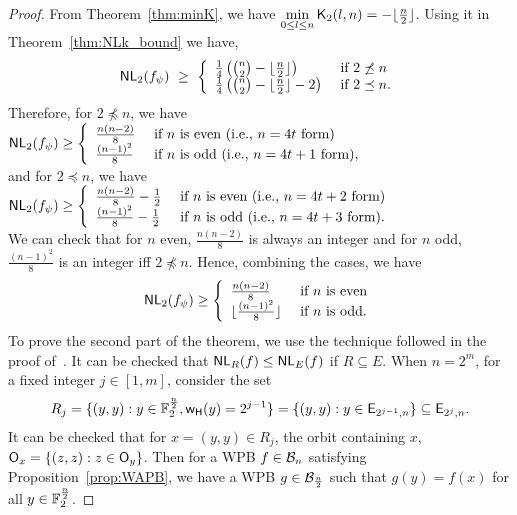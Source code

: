 \documentclass{llncs}
\begin{document}
\begin{proof}
From Theorem~\ref{thm:minK}, we have 
$\min\limits_{0 \leq l \leq n} \mathsf{K}_{2}(l,n) = -\lfloor \frac{n}{2} \rfloor$. 
Using it in Theorem~\ref{thm:NLk_bound} we have,
$$\mathsf{NL}_{2}(f_\psi) ~\geq ~ 
\left\{ \begin{array}{ll}
\frac{1}{4}\left({n \choose 2} - \lfloor \frac{n}{2} \rfloor\right)  & \text{ if }  2 \not\preceq n \\
\frac{1}{4}\left({n \choose 2} -\lfloor \frac{n}{2} \rfloor - 2\right) & \text{ if } 2 \preceq n.
\end{array}   \right.$$
Therefore, for $2 \npreceq n$, we have
$\mathsf{NL}_{2}(f_\psi) \geq \left\{
\begin{array}{ll}
 \frac{n(n-2)}{8} & \text{ if } n \text{ is even (i.e., $n = 4t$ form)}\\
 \frac{(n-1)^2}{8} & \text{ if } n \text{ is odd (i.e., $n = 4t+1$ form)},
\end{array} \right.$\\
and for $2 \preceq n$, we have 
$\mathsf{NL}_{2}(f_\psi) \geq \left\{
\begin{array}{ll}
 \frac{n(n-2)}{8}-\frac{1}{2} & \text{ if } n \text{ is even (i.e., $n = 4t+2$ form)} \\
 \frac{(n-1)^2}{8}-\frac{1}{2} & \text{ if } n \text{ is odd (i.e., $n = 4t+3$ form)}.
\end{array} \right.$\\
We can check that for $n$ even, $\frac{n(n-2)}{8}$ is always an integer and for 
$n$ odd, $\frac{(n-1)^2}{8}$ is an integer iff $2 \npreceq n$. Hence, combining the cases, we have 
$$\mathsf{NL}_{2}(f_\psi) \geq \left\{
\begin{array}{ll}
 \frac{n(n-2)}{8} & \text{ if } n \text{ is even} \\
 \lfloor\frac{(n-1)^2}{8}\rfloor & \text{ if } n \text{ is odd}.
\end{array} \right.$$
To prove the second part of the theorem, we use the technique followed in the proof of~\cite[Theorem-3.14]{DCC:LiuMes19}.
It can be checked that $\mathsf{NL}_{R}(f) \leq \mathsf{NL}_{E}(f)$ if $R \subseteq E$.
When $n = 2^m$, for a fixed integer $j \in [1,m]$, consider the set  
$$R_j = \{(y,y) : y \in \mathbb{F}_2^{\frac{n}{2}}, \mathsf{w_H}(y)= 2^{j-1} \} = \{(y,y) : y \in \mathsf{E}_{2^{j-1},n} \} \subseteq \mathsf{E}_{2^j,n}.$$
It can be checked that for $x = (y,y) \in R_j$, the orbit containing $x$, $\mathsf{O}_x = \{(z,z) : z \in \mathsf{O}_y\}$.
Then for a WPB $f \in \mathcal{B}_n$ satisfying Proposition~\ref{prop:WAPB}, we have a WPB $g \in \mathcal{B}_{\frac{n}{2}}$  such that $g(y) = f(x)$ for all $y \in \mathbb{F}_2^{\frac{n}{2}}$. 

\end{proof}
\end{document}
